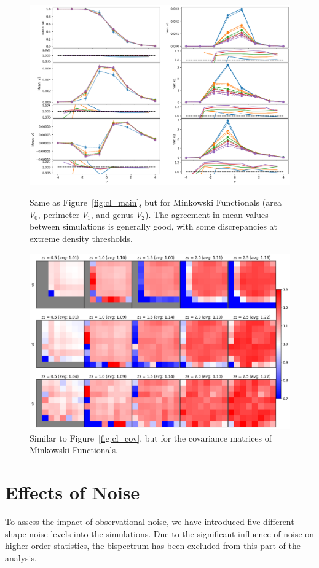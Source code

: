 \begin{figure}[p]
    \centering
    \includegraphics[width=\textwidth]{figures/results/mfs_main.png}
    \caption{Same as Figure~\ref{fig:cl_main}, but for Minkowski Functionals (area $V_0$, perimeter $V_1$, and genus $V_2$). The agreement in mean values between simulations is generally good, with some discrepancies at extreme density thresholds.}
    \label{fig:mfs_main}
    \vspace{0.5cm}
    \includegraphics[width=\textwidth]{figures/results/mfs_cov.png}
    \caption{Similar to Figure~\ref{fig:cl_cov}, but for the covariance matrices of Minkowski Functionals. }
    \label{fig:mfs_cov}
\end{figure}

\section{Effects of Noise}
To assess the impact of observational noise, we have introduced five different shape noise levels into the simulations. Due to the significant influence of noise on higher-order statistics, the bispectrum has been excluded from this part of the analysis.

